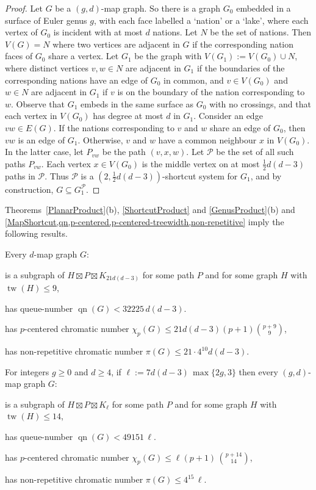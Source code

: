 \documentclass{patmorin}
\DeclareMathOperator{\tw}{tw}
\DeclareMathOperator{\qn}{qn}
\newcommand{\PP}{\mathcal{P}}
\renewcommand{\geq}{\geqslant}
\renewcommand{\leq}{\leqslant}
\begin{document}
\begin{proof}
Let $G$ be a $(g,d)$-map graph. So there is a graph $G_0$ embedded in a surface of Euler genus $g$, with each face labelled a `nation' or a `lake', where each vertex of $G_0$ is incident with at most $d$ nations. Let $N$ be the set of nations. Then $V(G)=N$ where two vertices are adjacent in $G$ if the corresponding nation faces of $G_0$ share a vertex. Let $G_1$ be the graph with $V(G_1):=V(G_0) \cup N$, where distinct vertices $v,w\in N$ are adjacent in $G_1$ if the boundaries of the corresponding nations have an edge of $G_0$ in common, and $v\in V(G_0)$ and $w\in N$ are adjacent in $G_1$ if $v$ is on the boundary of the nation corresponding to $w$. Observe that $G_1$ embeds in the same surface as $G_0$ with no crossings, and that each vertex in $V(G_0)$ has degree at most $d$ in $G_1$. Consider an edge $vw\in E(G)$. If the nations corresponding to $v$ and $w$ share an edge of $G_0$, then $vw$ is an edge of $G_1$. Otherwise,  $v$ and $w$ have a common neighbour $x$ in $V(G_0)$. In the latter case, let $P_{vw}$ be the path $(v,x,w)$. Let $\PP$ be the set of all such paths $P_{vw}$. Each vertex $x\in V(G_0)$ is the middle vertex on at most $\tfrac12 d(d-3)$  paths in $\PP$. Thus $\PP$ is a $(2,\tfrac12 d(d-3))$-shortcut system for $G_1$, and by construction, $G \subseteq G_1^\PP$.
\end{proof}

Theorems~\ref{PlanarProduct}(b),  \ref{ShortcutProduct} 
and  \ref{GenusProduct}(b) and \cref{MapShortcut,qn,p-centered,p-centered-treewidth,non-repetitive} imply the following results. 

\begin{thm}
\label{PlaneMapPartition}
Every $d$-map graph $G$:
	\begin{compactitem}
		\item is a subgraph of $H \boxtimes P \boxtimes K_{21d(d-3)}$ for some path $P$ and for some graph $H$ with $\tw(H)\leq 9$,
		\item has queue-number $\qn(G) < 32225\, d(d-3)$. 
		\item has $p$-centered chromatic number $\chi_p(G) \leq 21d(d-3) (p+1)  \binom{p+9}{9}$, 
		\item has non-repetitive chromatic number $ \pi(G) \leq 21 \cdot 4^{10} d(d-3)$.
	\end{compactitem}
\end{thm}

\begin{thm}
\label{MapPartition}
For integers $g\geq 0$ and $d\geq 4$, if $\ell:=  7d(d-3)\, \max\{2g,3\}$ then every $(g,d)$-map graph $G$:
\begin{compactitem}
\item is a subgraph of $H \boxtimes P \boxtimes K_{\ell}$ for some path $P$ and for some graph $H$ with $\tw(H)\leq 14$,
\item has queue-number $\qn(G) <  49151\, \ell $. 
\item has $p$-centered chromatic number $\chi_p(G) \leq \ell (p+1)\,  \binom{p+14}{14}$, 
\item has non-repetitive chromatic number $ \pi(G) \leq 4^{15}\,\ell $.	
\end{compactitem}
\end{thm}
\end{document}
